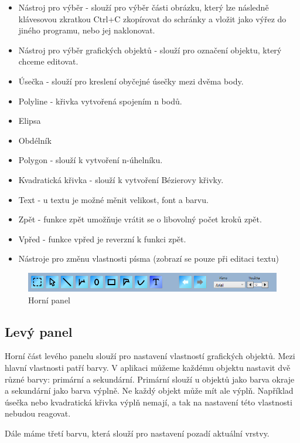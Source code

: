\documentclass[
  field=inf,
  biblatex,
  glossaries,
  index
]{kidiplom}
\begin{document}
\begin{itemize}
\item Nástroj pro výběr - slouží pro výběr části obrázku, který lze následně klávesovou zkratkou Ctrl+C zkopírovat do schránky a vložit jako výřez do jiného programu, nebo jej naklonovat.
\item Nástroj pro výběr grafických objektů - slouží pro označení objektu, který chceme editovat.
\item Úsečka - slouží pro kreslení obyčejné úsečky mezi dvěma body.
\item Polyline - křivka vytvořená spojením n bodů.
\item Elipsa
\item Obdélník
\item Polygon - slouží k vytvoření n-úhelníku.
\item Kvadratická křivka - slouží k vytvoření Bézierovy křivky.
\item Text - u textu je možné měnit velikost, font a barvu.
\item Zpět - funkce zpět umožňuje vrátit se o libovolný počet kroků zpět.
\item Vpřed - funkce vpřed je reverzní k funkci zpět.
\item Nástroje pro změnu vlastnosti písma (zobrazí se pouze při editaci textu)
\end{itemize}

\begin{figure}
\includegraphics[width=16cm]{img/toppanel}
\caption{Horní panel}
\end{figure}


\subsection{Levý panel}

Horní část levého panelu slouží pro nastavení vlastností grafických objektů. Mezi hlavní vlastnosti patří barvy. V aplikaci můžeme každému objektu nastavit dvě různé barvy: primární a sekundární. Primární slouží u objektů jako barva okraje a sekundární jako barva výplně. Ne každý objekt může mít ale výplň. Například úsečka nebo kvadratická křivka výplň nemají, a tak na nastavení této vlastnosti nebudou reagovat. 

Dále máme třetí barvu, která slouží pro nastavení pozadí aktuální vrstvy.
\end{document}
